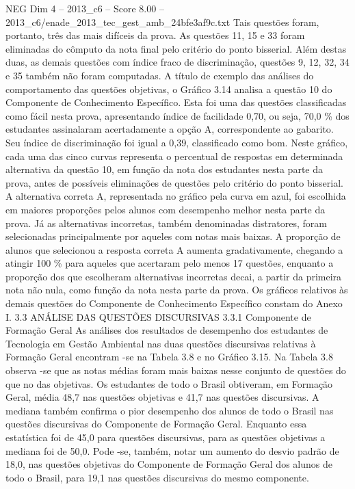 \begin{textsample}{NEG Dim 4 – 2013\_c6 – Score 8.00 – 2013\_c6/enade\_2013\_tec\_gest\_amb\_24bfe3af9c.txt}
Tais questões foram, portanto, três das mais difíceis da prova.
As questões 11, 15 e 33 foram eliminadas do cômputo da nota final pelo critério do ponto bisserial.
Além destas duas, as demais questões com índice fraco de discriminação, questões 9, 12, 32, 34 e 35 também não foram computadas.
A título de exemplo das análises do comportamento das questões objetivas, o Gráfico 3.14 analisa a questão 10 do Componente de Conhecimento Específico.
Esta foi uma das questões classificadas como fácil nesta prova, apresentando índice de facilidade 0,70, ou seja, 70,0 \% dos estudantes assinalaram acertadamente a opção A, correspondente ao gabarito.
Seu índice de discriminação foi igual a 0,39, classificado como bom.
Neste gráfico, cada uma das cinco curvas representa o percentual de respostas em determinada alternativa da questão 10, em função da nota dos estudantes nesta parte da prova, antes de possíveis eliminações de questões pelo critério do ponto bisserial.
A alternativa correta A, representada no gráfico pela curva em azul, foi escolhida em maiores proporções pelos alunos com desempenho melhor nesta parte da prova.
Já as alternativas incorretas, também denominadas distratores, foram selecionadas principalmente por aqueles com notas mais baixas.
A proporção de alunos que selecionou a resposta correta A aumenta gradativamente, chegando a atingir 100 \% para aqueles que acertaram pelo menos 17 questões, enquanto a proporção dos que escolheram alternativas incorretas decai, a partir da primeira nota não nula, como função da nota nesta parte da prova.
Os gráficos relativos às demais questões do Componente de Conhecimento Específico constam do Anexo I. 3.3 ANÁLISE DAS QUESTÕES DISCURSIVAS 3.3.1 Componente de Formação Geral As análises dos resultados de desempenho dos estudantes de Tecnologia em Gestão Ambiental nas duas questões discursivas relativas à Formação Geral encontram -se na Tabela 3.8 e no Gráfico 3.15.
Na Tabela 3.8 observa -se que as notas médias foram mais baixas nesse conjunto de questões do que no das objetivas.
Os estudantes de todo o Brasil obtiveram, em Formação Geral, média 48,7 nas questões objetivas e 41,7 nas questões discursivas.
A mediana também confirma o pior desempenho dos alunos de todo o Brasil nas questões discursivas do Componente de Formação Geral.
Enquanto essa estatística foi de 45,0 para questões discursivas, para as questões objetivas a mediana foi de 50,0.
Pode -se, também, notar um aumento do desvio padrão de 18,0, nas questões objetivas do Componente de Formação Geral dos alunos de todo o Brasil, para 19,1 nas questões discursivas do mesmo componente.

\end{textsample}
